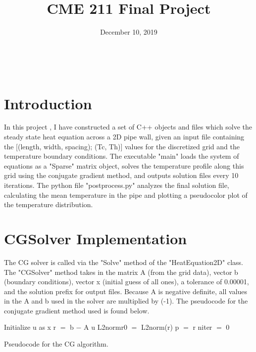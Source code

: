 \documentclass{article}
\begin{document}
\title{CME 211 Final Project \vspace{-5ex}}
\date{December 10, 2019}
\maketitle\
\vspace{-2ex}

\section{Introduction}

In this project \cite{LeGresley_1}\cite{LeGresley_2}, I have constructed a set of C++ objects and files which solve the steady state heat equation across a 2D pipe wall, given an input file containing the [(length, width, spacing); (Tc, Th)] values for the discretized grid and the temperature boundary conditions. The executable "main" loads the system of equations as a "Sparse" matrix object, solves the temperature profile along this grid using the conjugate gradient method, and outputs solution files every 10 iterations. The python file "postprocess.py" analyzes the final solution file, calculating the mean temperature in the pipe and plotting a pseudocolor plot of the temperature distribution.

\section{CGSolver Implementation}

The CG solver is called via the "Solve" method of the "HeatEquation2D" class. The "CGSolver" method takes in the matrix A (from the grid data), vector b (boundary conditions), vector x (initial guess of all ones), a tolerance of 0.00001, and the solution prefix for output files. Because A is negative definite, all values in the A and b used in the solver are multiplied by (-1). The pseudocode for the conjugate gradient method used is found below.
\vspace{2ex}

\begin{algorithm}[H]
	\SetAlgoLined
	Initialize u as x\;
	r $=$ b $-$ A u\;
	L2normr0 $=$ L2norm(r)\;
	p $=$ r\;
	niter $=$ 0\;
	\caption{Pseudocode for the CG algorithm. \cite{LeGresley_1}}
\end{algorithm}
\end{document}
